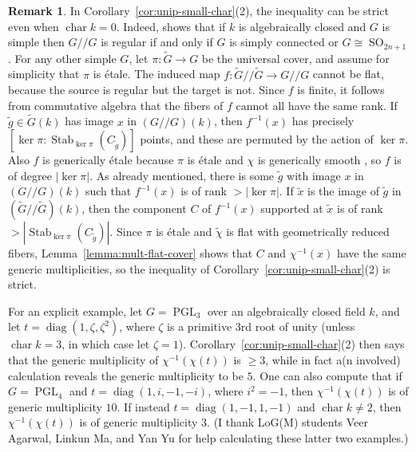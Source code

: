 \documentclass[11pt,reqno]{amsart}
\theoremstyle{definition}
\newtheorem{remark}[theorem]{Remark}
\DeclareMathOperator{\chara}{char}
\DeclareMathOperator{\diag}{diag}
\DeclareMathOperator{\PGL}{PGL}
\DeclareMathOperator{\SO}{SO}
\DeclareMathOperator{\Stab}{Stab}
\begin{document}
\begin{remark}\label{remark:twisted-steinberg-fiber}
    In Corollary~\ref{cor:unip-small-char}(2), the inequality can be strict even when $\chara k = 0$. Indeed, \cite[Theorem 3]{Steinberg-Pittie} shows that if $k$ is algebraically closed and $G$ is simple then $G/\!/G$ is regular if and only if $G$ is simply connected or $G \cong \SO_{2n+1}$. For any other simple $G$, let $\pi\colon \widetilde{G} \to G$ be the universal cover, and assume for simplicity that $\pi$ is \'etale. The induced map $f\colon \widetilde{G}/\!/\widetilde{G} \to G/\!/G$ cannot be flat, because the source is regular but the target is not. Since $f$ is finite, it follows from commutative algebra that the fibers of $f$ cannot all have the same rank. If $\widetilde{g} \in \widetilde{G}(k)$ has image $x$ in $(G/\!/G)(k)$, then $f^{-1}(x)$ has precisely $[\ker\pi:\Stab_{\ker \pi}(C_{\widetilde{g}})]$ points, and these are permuted by the action of $\ker \pi$. Also $f$ is generically \'etale because $\pi$ is \'etale and $\chi$ is generically smooth \cite[Theorem 3.10]{Slodowy}, so $f$ is of degree $|\ker \pi|$. As already mentioned, there is some $\widetilde{g}$ with image $x$ in $(G/\!/G)(k)$ such that $f^{-1}(x)$ is of rank $> |\ker \pi|$. If $\widetilde{x}$ is the image of $\widetilde{g}$ in $(\widetilde{G}/\!/\widetilde{G})(k)$, then the component $C$ of $f^{-1}(x)$ supported at $\widetilde{x}$ is of rank $> |\Stab_{\ker \pi}(C_{\widetilde{g}})|$. Since $\pi$ is \'etale and $\widetilde{\chi}$ is flat with geometrically reduced fibers, Lemma~\ref{lemma:mult-flat-cover} shows that $C$ and $\chi^{-1}(x)$ have the same generic multiplicities, so the inequality of Corollary~\ref{cor:unip-small-char}(2) is strict.
    
    For an explicit example, let $G = \PGL_3$ over an algebraically closed field $k$, and let $t = \diag(1, \zeta, \zeta^2)$, where $\zeta$ is a primitive $3$rd root of unity (unless $\chara k = 3$, in which case let $\zeta = 1$). Corollary~\ref{cor:unip-small-char}(2) then says that the generic multiplicity of $\chi^{-1}(\chi(t))$ is $\geq 3$, while in fact a(n involved) calculation reveals the generic multiplicity to be $5$. One can also compute that if $G = \PGL_4$ and $t = \diag(1, i, -1, -i)$, where $i^2 = -1$, then $\chi^{-1}(\chi(t))$ is of generic multiplicity $10$. If instead $t = \diag(1, -1, 1, -1)$ and $\chara k \neq 2$, then $\chi^{-1}(\chi(t))$ is of generic multiplicity $3$. (I thank LoG(M) students Veer Agarwal, Linkun Ma, and Yan Yu for help calculating these latter two examples.)


\end{remark}
\end{document}
